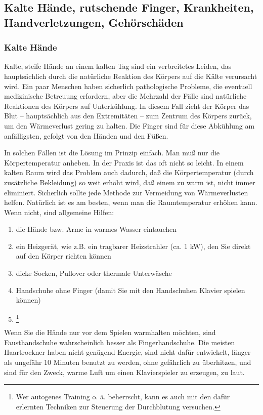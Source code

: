 
\subsection{Kalte Hände, rutschende Finger, Krankheiten, Handverletzungen, Gehörschäden}
\label{c1iii10}

\subsubsection{Kalte Hände}

Kalte, steife Hände an einem kalten Tag sind ein verbreitetes Leiden, das hauptsächlich durch die natürliche Reaktion des Körpers auf die Kälte verursacht wird.
Ein paar Menschen haben sicherlich pathologische Probleme, die eventuell medizinische Betreuung erfordern, aber die Mehrzahl der Fälle sind natürliche Reaktionen des Körpers auf Unterkühlung.
In diesem Fall zieht der Körper das Blut -- hauptsächlich aus den Extremitäten -- zum Zentrum des Körpers zurück, um den Wärmeverlust gering zu halten.
Die Finger sind für diese Abkühlung am anfälligsten, gefolgt von den Händen und den Füßen.

In solchen Fällen ist die Lösung im Prinzip einfach.
Man muß nur die Körpertemperatur anheben.
In der Praxis ist das oft nicht so leicht.
In einem kalten Raum wird das Problem auch dadurch, daß die Körpertemperatur (durch zusätzliche Bekleidung) so weit erhöht wird, daß einem zu warm ist, nicht immer eliminiert.
Sicherlich sollte jede Methode zur Vermeidung von Wärmeverlusten helfen.
Natürlich ist es am besten, wenn man die Raumtemperatur erhöhen kann.
Wenn nicht, sind allgemeine Hilfen:
\begin{enumerate}[label={\arabic*.}] 
\item die Hände bzw. Arme in warmes Wasser eintauchen
\item ein Heizgerät, wie z.B. ein tragbarer Heizstrahler (ca. 1 kW), den Sie direkt auf den Körper richten können
\item dicke Socken, Pullover oder thermale Unterwäsche
\item Handschuhe ohne Finger (damit Sie mit den Handschuhen Klavier spielen können)
\item \footnote{Wer autogenes Training o. ä. beherrscht, kann es auch mit den dafür erlernten Techniken zur Steuerung der Durchblutung versuchen.}
 \end{enumerate}
Wenn Sie die Hände nur vor dem Spielen warmhalten möchten, sind Fausthandschuhe wahrscheinlich besser als Fingerhandschuhe.
Die meisten Haartrockner haben nicht genügend Energie, sind nicht dafür entwickelt, länger als ungefähr 10 Minuten benutzt zu werden, ohne gefährlich zu überhitzen, und sind für den Zweck, warme Luft um einen Klavierspieler zu erzeugen, zu laut.

